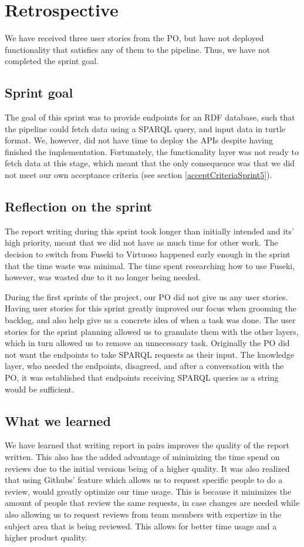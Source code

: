 \section{Retrospective}
We have received three user stories from the PO, but have not deployed functionality that satisfies any of them to the \knox{} pipeline. Thus, we have not completed the sprint goal.

\subsection{Sprint goal}
The goal of this sprint was to provide endpoints for an RDF database, such that the \knox{} pipeline could fetch data using a SPARQL query, and input data in turtle format. We, however, did not have time to deploy the APIs despite having finished the implementation. Fortunately, the functionality layer was not ready to fetch data at this stage, which meant that the only consequence was that we did not meet our own acceptance criteria (see section \ref{acceptCriteriaSprint5}).

\subsection{Reflection on the sprint}
The report writing during this sprint took longer than initially intended and its' high priority, meant that we did not have as much time for other work.
The decision to switch from Fuseki to Virtuoso happened early enough in the sprint that the time waste was minimal. The time spent researching how to use Fuseki, however, was wasted due to it no longer being needed.

During the first sprints of the project, our PO did not give us any user stories. Having user stories for this sprint greatly improved our focus when grooming the backlog, and also help give us a concrete idea of when a task was done. 
The user stories for the sprint planning allowed us to granulate them with the other layers, which in turn allowed us to remove an unnecessary task. Originally the PO did not want the endpoints to take SPARQL requests as their input.
The knowledge layer, who needed the endpoints, disagreed, and after a conversation with the PO, it was established that endpoints receiving SPARQL queries as a string would be sufficient.

\subsection{What we learned}
We have learned that writing report in pairs improves the quality of the report written. This also has the added advantage of minimizing the time spend on reviews due to the initial versions being of a higher quality.
It was also realized that using Githubs' feature which allows us to request specific people to do a review, would greatly optimize our time usage. This is because it minimizes the amount of people that review the same requests, in case changes are needed while also allowing us to request reviews from team members with expertize in the subject area that is being reviewed. This allows for better time usage and a higher product quality. 

